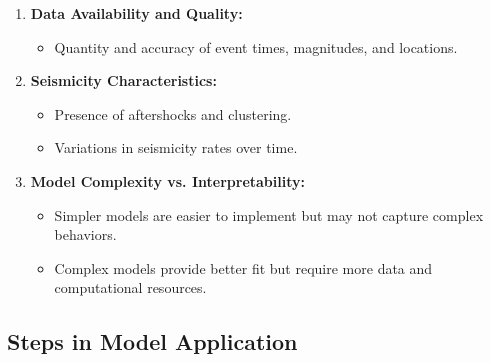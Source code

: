 \documentclass{article}
\begin{document}
\begin{enumerate}
    \item \textbf{Data Availability and Quality:}

    \begin{itemize}
        \item Quantity and accuracy of event times, magnitudes, and locations.
    \end{itemize}

    \item \textbf{Seismicity Characteristics:}

    \begin{itemize}
        \item Presence of aftershocks and clustering.
        \item Variations in seismicity rates over time.
    \end{itemize}

    \item \textbf{Model Complexity vs. Interpretability:}

    \begin{itemize}
        \item Simpler models are easier to implement but may not capture complex behaviors.
        \item Complex models provide better fit but require more data and computational resources.
    \end{itemize}
\end{enumerate}

\subsection{Steps in Model Application}
\end{document}

